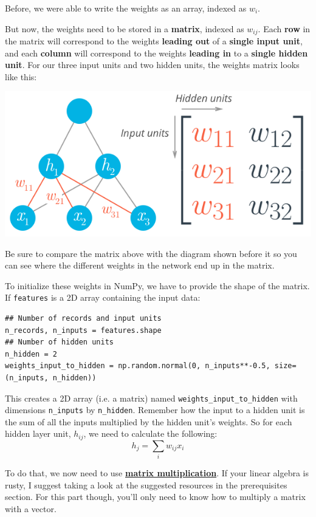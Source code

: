 Before, we were able to write the weights as an array, indexed as \(w_i\). \newline

But now, the weights need to be stored in a \textbf{matrix}, indexed as \(w_{ij}\). Each \textbf{row} in the matrix will correspond to the weights \textbf{leading out} of a \textbf{single input unit}, and each \textbf{column} will correspond to the weights \textbf{leading in} to a \textbf{single hidden unit}. For our three input units and two hidden units, the weights matrix looks like this:

\includegraphics[width=0.5\linewidth]{img//intro//multilayer-diagram-weights.png}

Be sure to compare the matrix above with the diagram shown before it so you can see where the different weights in the network end up in the matrix.

To initialize these weights in NumPy, we have to provide the shape of the matrix. If \lstinline{features} is a 2D array containing the input data:

\begin{lstlisting}
## Number of records and input units
n_records, n_inputs = features.shape
## Number of hidden units
n_hidden = 2
weights_input_to_hidden = np.random.normal(0, n_inputs**-0.5, size=(n_inputs, n_hidden))
\end{lstlisting}

This creates a 2D array (i.e. a matrix) named \verb|weights_input_to_hidden| with dimensions \verb|n_inputs| by \verb|n_hidden|. Remember how the input to a hidden unit is the sum of all the inputs multiplied by the hidden unit's weights. So for each hidden layer unit, \(h_{ij}\), we need to calculate the following: \[h_j = \sum_i w_{ij} x_i\]

To do that, we now need to use \href{https://en.wikipedia.org/wiki/Matrix_multiplication}{\textbf{matrix multiplication}}. If your linear algebra is rusty, I suggest taking a look at the suggested resources in the prerequisites section. For this part though, you'll only need to know how to multiply a matrix with a vector. \newline

